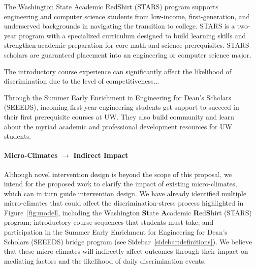 \begin{WrapText}
\begin{description}[leftmargin=1cm]
\item[STARS] The Washington State Academic RedShirt (STARS) program supports engineering and computer science students from low-income, first-generation, and underserved backgrounds in navigating the transition to college.
STARS is a two-year program with a specialized curriculum designed to build learning skills and strengthen academic preparation for core math and science prerequisites. STARS scholars are guaranteed placement into an engineering or computer science major.

\item[Introductory Sequence] The introductory course experience can significantly affect the likelihood of discrimination due to the level of competitiveness...
\item[SEEEDS Bridge Program] Through the Summer Early Enrichment in Engineering for Dean's Scholars (SEEEDS), incoming first-year engineering students get support to succeed in their first prerequisite courses at UW.  They also build community and learn about the myriad academic and professional development resources for UW students. 
\item[FIGS?]
\end{description}
\end{WrapText}

 \paragraph{Micro-Climates $\rightarrow$ Indirect Impact} Although novel intervention design is beyond the scope of this proposal, we intend for the proposed work to clarify the impact of existing micro-climates, which can in turn guide intervention design. We have already identified multiple micro-climates that could affect the discrimination-stress process highlighted in Figure~\ref{fig:model}, including the Washington \textbf{St}ate \textbf{A}cademic \textbf{R}ed\textbf{S}hirt (STARS) program; introductory course sequences that students must take; and participation in the Summer Early Enrichment for Engineering for Dean's Scholars (SEEEDS) bridge program (see Sidebar~\ref{sidebar:definitions}).  We believe that these micro-climates will indirectly affect outcomes through their impact on mediating factors and the likelihood of daily discrimination events. 
 
